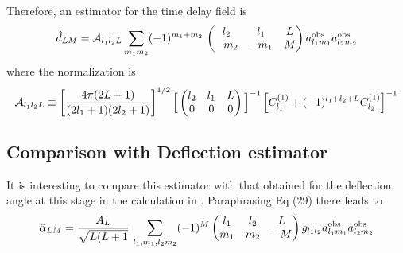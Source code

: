 \documentclass[prd,amsmath,amssymb,floatfix,superscriptaddress,nofootinbib,preprintnumbers]{revtex4-1}
\def\be{\begin{equation}}
\def\ee{\end{equation}}
\begin{document}
Therefore, an estimator for the time delay field is
\be
\hat d_{LM} = \mathcal{A}_{l_1l_2L} \sum_{m_1m_2}  (-1)^{m_1+m_2}\,\left(\begin{matrix} l_2 & l_1 &L\cr -m_2&-m_1&M\end{matrix}\right)
 a^{\rm obs}_{l_1m_1} a^{\rm obs}_{l_2m_2} 
 \ee
 where the normalization is
 \be
 \mathcal{A}_{l_1l_2L} \equiv 
 \left[ \frac{4\pi (2L+1)}{(2l_1+1)(2l_2+1)}\right]^{1/2}
 \Big[
 \left(\begin{matrix} l_2& l_1 &L\cr 0&0&0\end{matrix}\right)
  \Big]^{-1}
  \left[ C^{(1)}_{l_1} + (-1)^{l_1+l_2+L}C^{(1)}_{l_2}\right]^{-1}
 \ee
 
 \subsection{Comparison with Deflection estimator}
 
 It is interesting to compare this estimator with that obtained for the deflection angle at this stage in the calculation in \citet{Okamoto:2003zw}. Paraphrasing Eq (29) there leads to
 \be
 \hat\alpha_{LM} = \frac{A_L}{\sqrt{L(L+1}}\,\sum_{l_1,m_1,l_2m_2}
 (-1)^M \left(\begin{matrix} l_1& l_2 &L\cr m_1&m_2&-M \end{matrix}\right)
 g_{l_1l_2}
 a^{\rm obs}_{l_1m_1} a^{\rm obs}_{l_2m_2} 
 \ee
 

\end{document}
